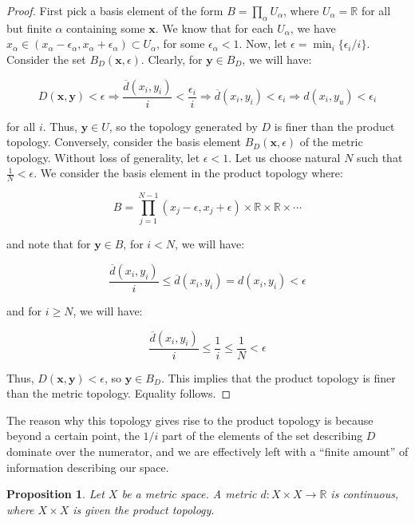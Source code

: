\documentclass[10pt, oneside]{amsart}
\newtheorem{prop}{Proposition}
\newcommand{\bm}{\boldsymbol}
\begin{document}
    \begin{proof}
      First pick a basis element of the form $B = \prod_{\alpha} U_{\alpha}$, where $U_{\alpha} = \mathbb{R}$ for all but finite $\alpha$ containing some $\bm{x}$. We know that for each $U_{\alpha}$, we
      have $x_\alpha \in (x_\alpha - \epsilon_\alpha, x_\alpha + \epsilon_\alpha) \subset U_\alpha$, for some $\epsilon_\alpha < 1$. Now, let $\epsilon = \min_{i} \{\epsilon_i/i\}$. Consider the set $B_{D}(\bm{x}, \epsilon)$.
      Clearly, for $\bm{y} \in B_D$, we will have:

      $$D(\bm{x}, \bm{y}) < \epsilon \Rightarrow \frac{\overline{d}(x_i, y_i)}{i} < \frac{\epsilon_i}{i} \Rightarrow \overline{d}(x_i, y_i) < \epsilon_i \Rightarrow d(x_i, y_u) < \epsilon_i$$

      for all $i$. Thus, $\bm{y} \in U$, so the topology generated by $D$ is finer than the product topology. Conversely, consider the basis element $B_{D}(\bm{x}, \epsilon)$ of the metric topology. Without loss of generality, let $\epsilon < 1$. Let us choose
      natural $N$ such that $\frac{1}{N} < \epsilon$. We consider the basis element in the product topology where:

      $$B = \displaystyle\prod_{j = 1}^{N - 1} \left( x_j - \epsilon, x_j + \epsilon \right) \times \mathbb{R} \times \mathbb{R} \times \cdots$$

      and note that for $\bm{y} \in B$, for $i < N$, we will have:

      $$\frac{\overline{d}(x_i, y_i)}{i} \leq \overline{d}(x_i, y_i) = d(x_i, y_i) < \epsilon$$

      and for $i \geq N$, we will have:

      $$\frac{\overline{d}(x_i, y_i)}{i} \leq \frac{1}{i} \leq \frac{1}{N} < \epsilon$$

      Thus, $D(\bm{x}, \bm{y}) < \epsilon$, so $\bm{y} \in B_D$. This implies that the product topology is finer than the metric topology. Equality follows.
    \end{proof}

    The reason why this topology gives rise to the product topology is because beyond a certain point, the $1/i$ part of the elements of the set describing $D$ dominate over the numerator, and
    we are effectively left with a ``finite amount'' of information describing our space.

    \begin{prop}
      Let $X$ be a metric space. A metric $d : X \times X \rightarrow \mathbb{R}$ is continuous, where $X \times X$ is given the product topology.
    \end{prop}
\end{document}
